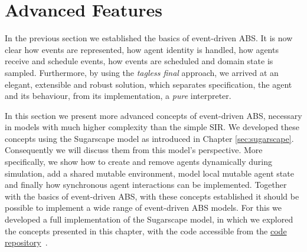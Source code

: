 \section{Advanced Features}
\label{sec:advanced_eventdriven_ABS}

In the previous section we established the basics of event-driven ABS. It is now clear how events are represented, how agent identity is handled, how agents receive and schedule events, how events are scheduled and domain state is sampled. Furthermore, by using the \textit{tagless final} approach, we arrived at an elegant, extensible and robust solution, which separates specification, the agent and its behaviour, from its implementation, a \textit{pure} interpreter. 

In this section we present more advanced concepts of event-driven ABS, necessary in models with much higher complexity than the simple SIR. We developed these concepts using the Sugarscape model as introduced in Chapter \ref{sec:sugarscape}. Consequently we will discuss them from this model's perspective. More specifically, we show how to create and remove agents dynamically during simulation, add a shared mutable environment, model local mutable agent state and finally how synchronous agent interactions can be implemented. Together with the basics of event-driven ABS, with these concepts established it should be possible to implement a wide range of event-driven ABS models. For this we developed a full implementation of the Sugarscape model, in which we explored the concepts presented in this chapter, with the code accessible from the \href{https://github.com/thalerjonathan/haskell-sugarscape}{code repository}~\cite{thaler_sugarscape_repository}.









